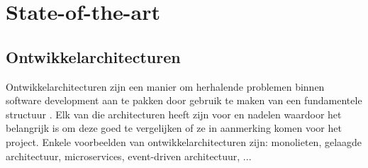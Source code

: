     
%
%
%
%
%
%


\section{State-of-the-art}%
\label{sec:state-of-the-art}
\subsection{Ontwikkelarchitecturen}
Ontwikkelarchitecturen zijn een manier om herhalende problemen binnen software development aan te pakken door gebruik te maken van een fundamentele structuur \autocite{Dhaduk2020}. Elk van die architecturen heeft zijn voor en nadelen waardoor het belangrijk is om deze goed te vergelijken of ze in aanmerking komen voor het project. Enkele voorbeelden van ontwikkelarchitecturen zijn: monolieten, gelaagde architectuur, microservices, event-driven architectuur, ...


